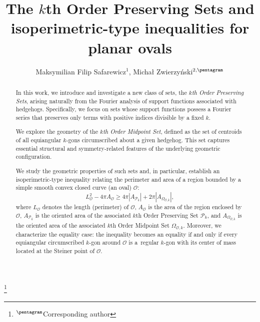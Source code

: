 \documentclass{amsart}
\theoremstyle{definition}
\numberwithin{equation}{section}
\begin{document}
\title[The $k$th Order Preserving Set] {The $k$th Order Preserving Sets and isoperimetric-type inequalities for planar ovals}

\author[M.F. Safarewicz and M. Zwierzy\'nski]{Maksymilian Filip Safarewicz$^{1}$, Michał Zwierzy\'nski$^{2,\pentagram}$}
\address{Warsaw University of Technology\\
Faculty of Mathematics and Information Science\\
ul. Koszykowa 75\\
00-662 Warszawa\\
Poland}

\thanks{$^{\pentagram}$Corresponding author}





\begin{abstract}
In this work, we introduce and investigate a new class of sets, the \textit{$k$th Order Preserving Sets}, arising naturally from the Fourier analysis of support functions associated with hedgehogs. Specifically, we focus on sets whose support functions possess a Fourier series that preserves only terms with positive indices divisible by a fixed $k$.

We explore the geometry of the \textit{$k$th Order Midpoint Set}, defined as the set of centroids of all equiangular $k$-gons circumscribed about a given hedgehog. This set captures essential structural and symmetry-related features of the underlying geometric configuration.

We study the geometric properties of such sets and, in particular, establish an isoperimetric-type inequality relating the perimeter and area of a region bounded by a simple smooth convex closed curve (an oval) $\mathcal{O}$:
\[
L_{\mathcal{O}}^2 - 4\pi A_{\mathcal{O}} \geqslant 4\pi |A_{\mathcal{P}_k}| + 2\pi |A_{\Omega_{\mathcal{O},k}}|,
\]
where $L_{\mathcal{O}}$ denotes the length (perimeter) of $\mathcal{O}$, $A_{\mathcal{O}}$ is the area of the region enclosed by $\mathcal{O}$, $A_{\mathcal{P}_k}$ is the oriented area of the associated $k$th Order Preserving Set $\mathcal{P}_k$, and $A_{\Omega_{\mathcal{O},k}}$ is the oriented area of the associated $k$th Order Midpoint Set $\Omega_{\mathcal{O},k}$. Moreover, we characterize the equality case: the inequality becomes an equality if and only if every equiangular circumscribed $k$-gon around $\mathcal{O}$ is a~regular $k$-gon with its center of mass located at the Steiner point of $\mathcal{O}$.

\end{abstract}
\end{document}
